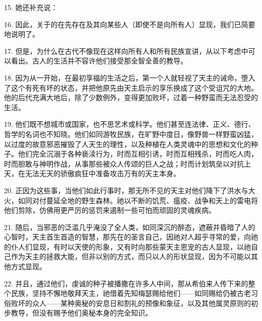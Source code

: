 15. 她还补充说：\par

16. 因此，关于的在先存在及其向某些人（即使不是向所有人）显现，我们已简要地说明了。\par

17. 但是，为什么在古代不像现在这样向所有人和所有民族宣讲，从以下考虑中可以看出。古人的生活并不容许他们接受那全智全善的教导。\par

18. 因为从一开始，在最初享福的生活之后，第一个人就轻视了天主的诫命，堕入了这个有死有坏的状态，并把他原先由天主启示的享乐换成了这个受诅咒的大地。他的后代充满大地后，除了少数例外，变得更加败坏，过着一种野蛮而无法忍受的生活。\par

19. 他们既不想城市或国家，也不思艺术或科学。他们甚至连法律、正义、德行、哲学的名词也不知晓。他们如同游牧民族，在旷野中度日，像野兽一样野蛮凶猛，以过度的故意邪恶摧毁了人天生的理性，以及种植在人类灵魂中的思想和文化的种子。他们完全沉溺于各种亵渎行为，时而互相引诱，时而互相残杀，时而吃人肉，时而胆敢与神明作战，从事那些被众人传颂的巨人之战；时而计划筑垒以对抗上天，在无法无天的骄傲疯狂中准备攻击万有的天主本身。\par

20. 正因为这些事，当他们如此行事时，那无所不见的天主对他们降下了洪水与大火，如同对付蔓延全地的野生森林。祂以不断的饥荒、瘟疫、战争和天上的雷电将他们剪除，仿佛用更严厉的惩罚来遏制一些可怕而顽固的灵魂疾病。\par

21. 随后，当邪恶的泛滥几乎淹没了全人类，如同深沉的醉态，遮蔽并昏暗了人的心智时，天主首生首造的智慧，那先在的圣言自己，因祂对人超乎寻常的爱，向祂的仆人们显现，有时以天使的形象，又有时向那些蒙天主恩宠的古人显现，以祂自己作为天主的拯救大能，但非以别的方式，而只以人的形状显现，因为不可能以其他方式显现。\par

22. 并且，通过他们，虔诚的种子被播撒在许多人中间，那从希伯来人传下来的整个民族，坚持不懈地敬拜天主，祂借着先知梅瑟赐给他们——如同赐给仍被古老习俗败坏的众人——某种奥秘的安息日和割礼的预像和象征，以及其他属灵原则的初步教导，但没有赐予他们奥秘本身的完全知识。\par

